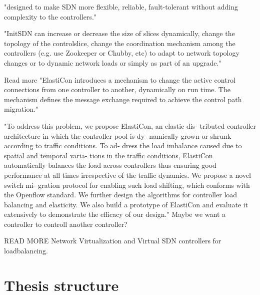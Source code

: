 "designed to make SDN more flexible, reliable, fault-tolerant without adding complexity to the controllers."

"InitSDN can increase or decrease the size of slices dynamically, change the topology of the controlslice, change the coordination mechanism among the controllers (e.g. use Zookeeper or Chubby, etc) to adapt to network topology changes or to dynamic network loads or simply as part of an upgrade."


\cite{ElastiCon} 
Read more
"ElastiCon introduces a mechanism to change the active control connections from one controller to another, dynamically on run time. The mechanism defines the message exchange required to achieve the control path migration."\cite{SDN_VN_ControlPath}

"To address this problem, we propose ElastiCon, an elastic dis- tributed controller architecture in which the controller pool is dy- namically grown or shrunk according to traffic conditions. To ad- dress the load imbalance caused due to spatial and temporal varia- tions in the traffic conditions, ElastiCon automatically balances the load across controllers thus ensuring good performance at all times irrespective of the traffic dynamics. We propose a novel switch mi- gration protocol for enabling such load shifting, which conforms with the Openflow standard. We further design the algorithms for controller load balancing and elasticity. We also build a prototype of ElastiCon and evaluate it extensively to demonstrate the efficacy of our design."
Maybe we want a controller to controll another controller?

\cite{SDN_VN_ControlPath} READ MORE
Network Virtualization and Virtual SDN controllers for loadbalancing. 

\section{Thesis structure}